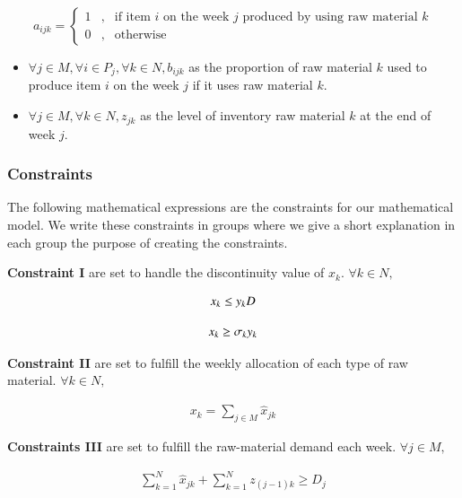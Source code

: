 \documentclass[preprint, 3p,
authoryear]{elsarticle} %
\providecommand{\tightlist}{%
  \setlength{\itemsep}{0pt}\setlength{\parskip}{0pt}}
\begin{document}
\[a_{ijk} = 
\left\{\begin{matrix}
1 & , & \text{if item } i \text{ on the week }j \text{ produced by using raw material } k  \\ 
0 & , & \text{otherwise}
\end{matrix}\right. 
\]

\begin{itemize}
\tightlist
\item
  \(\forall j \in M, \forall i \in P_j, \forall k \in N, b_{ijk}\) as
  the proportion of raw material \(k\) used to produce item \(i\) on the
  week \(j\) if it uses raw material \(k\).
\item
  \(\forall j \in M, \forall k \in N, z_{jk}\) as the level of inventory
  raw material \(k\) at the end of week \(j\).
\end{itemize}

\hypertarget{constraints}{%
\subsubsection{Constraints}\label{constraints}}

The following mathematical expressions are the constraints for our
mathematical model. We write these constraints in groups where we give a
short explanation in each group the purpose of creating the constraints.

\textbf{Constraint I} are set to handle the discontinuity value of
\(x_k\). \(\forall k \in N,\)

\begin{align}
  x_k \leq y_k \space D
\end{align}

\begin{align}
  x_k \geq \sigma_k \space y_k 
\end{align}

\textbf{Constraint II} are set to fulfill the weekly allocation of each
type of raw material. \(\forall k \in N,\)

\begin{align}
  x_k = \sum_{j \in M} \hat{x}_{jk}
\end{align}

\textbf{Constraints III} are set to fulfill the raw-material demand each
week. \(\forall j \in M,\)

\begin{align}
  \sum^{N}_{k=1} \hat{x}_{jk} + \sum^{N}_{k=1} z_{(j-1)k} \geq D_j 
\end{align}
\end{document}
